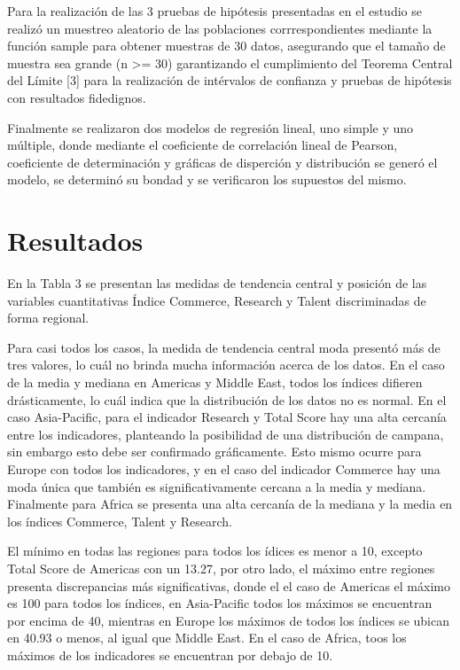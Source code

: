 \documentclass[
]{article}
\begin{document}
\begin{multicols}{2}
Para la realización de las 3 pruebas de hipótesis presentadas en el estudio se realizó un muestreo aleatorio de las poblaciones corrrespondientes mediante la función sample para obtener muestras de 30 datos, asegurando que el tamaño de muestra sea grande (n >= 30) garantizando el cumplimiento del Teorema Central del Límite [3] para la realización de intérvalos de confianza y pruebas de hipótesis con resultados fidedignos.

Finalmente se realizaron dos modelos de regresión lineal, uno simple y uno múltiple, donde mediante el coeficiente de correlación lineal de Pearson, coeficiente de determinación y gráficas de disperción y distribución se generó el modelo, se determinó su bondad y se verificaron los supuestos del mismo.







\section{Resultados}
En la Tabla 3 se presentan las medidas de tendencia central y posición de las variables cuantitativas Índice Commerce, Research y Talent discriminadas de forma regional. 

Para casi todos los casos, la medida de tendencia central moda presentó más de tres valores, lo cuál no brinda mucha información acerca de los datos. En el caso de la media y mediana en Americas y Middle East, todos los índices difieren drásticamente, lo cuál indica que la distribución de los datos no es normal. En el caso Asia-Pacific, para el indicador Research y Total Score hay una alta cercanía entre los indicadores, planteando la posibilidad de una distribución de campana, sin embargo esto debe ser confirmado gráficamente. Esto mismo ocurre para Europe con todos los indicadores, y en el caso del indicador Commerce hay una moda única que también es significativamente cercana a la media y mediana. Finalmente para Africa se presenta una alta cercanía de la mediana y la media en los índices Commerce, Talent y Research.

El mínimo en todas las regiones para todos los ídices es menor a 10, excepto Total Score de Americas con un 13.27, por otro lado, el máximo entre regiones presenta discrepancias más significativas, donde el el caso de Americas el máximo es 100 para todos los índices, en Asia-Pacific todos los máximos se encuentran por encima de 40, mientras en Europe los máximos de todos los índices se ubican en 40.93 o menos, al igual que Middle East. En el caso de Africa, toos los máximos de los indicadores se encuentran por debajo de 10.

\end{multicols}
\end{document}
